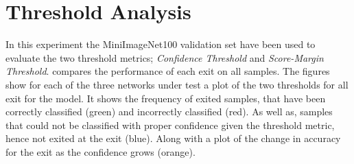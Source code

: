 %
%
%


\section{Threshold Analysis}

In this experiment the MiniImageNet100 validation set have been used to evaluate the two threshold metrics; \emph{Confidence Threshold} and \emph{Score-Margin Threshold}.  compares the performance of each exit on all samples. The figures show for each of the three networks under test a plot of the two thresholds for all exit for the model. It shows the frequency of exited samples, that have been correctly classified ({\color{sns-green}green}) and incorrectly classified ({\color{sns-red}red}). As well as, samples that could not be classified with proper confidence given the threshold metric, hence not exited at the exit ({\color{sns-blue}blue}). Along with a plot of the change in accuracy for the exit as the confidence grows ({\color{sns-orange}orange}).  

